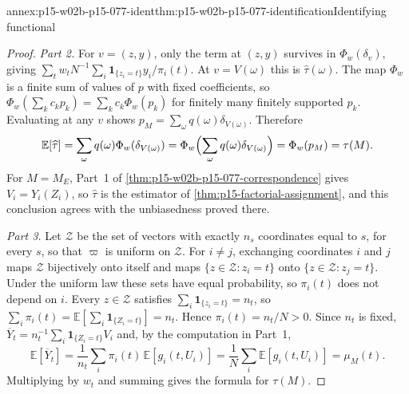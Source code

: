\begin{annexitem}{annex:p15-w02b-p15-077-ident}{thm:p15-w02b-p15-077-identification}{Identifying functional}
\begin{proof}
\emph{Part 2.} For \(v=(z,y)\), only the term at \((z,y)\) survives in
\(\Phi_w(\delta_v)\), giving
\(\sum_tw_tN^{-1}\sum_i\mathbf 1_{\{z_i=t\}}y_i/\pi_i(t)\). At
\(v=V(\omega)\) this is \(\widehat\tau(\omega)\). The map \(\Phi_w\) is a
finite sum of values of \(p\) with fixed coefficients, so
\(\Phi_w(\sum_kc_kp_k)=\sum_kc_k\Phi_w(p_k)\) for finitely many finitely
supported \(p_k\). Evaluating at any \(v\) shows
\(p_M=\sum_\omega q(\omega)\delta_{V(\omega)}\). Therefore
\[
 \mathbb E[\widehat\tau]=\sum_\omega q(\omega)\Phi_w(\delta_{V(\omega)})
 =\Phi_w\Bigl(\sum_\omega q(\omega)\delta_{V(\omega)}\Bigr)
 =\Phi_w(p_M)=\tau(M).
\]
For \(M=M_E\), Part~1 of \cref{thm:p15-w02b-p15-077-correspondence} gives
\(V_i=Y_i(Z_i)\), so \(\widehat\tau\) is the estimator of
\cref{thm:p15-factorial-assignment}, and this conclusion agrees with the
unbiasedness proved there.

\emph{Part 3.} Let \(\mathcal Z\) be the set of vectors with exactly
\(n_s\) coordinates equal to \(s\), for every \(s\), so that \(\varpi\)
is uniform on \(\mathcal Z\). For \(i\ne j\), exchanging coordinates
\(i\) and \(j\) maps \(\mathcal Z\) bijectively onto itself and maps
\(\{z\in\mathcal Z:z_i=t\}\) onto \(\{z\in\mathcal Z:z_j=t\}\). Under the
uniform law these sets have equal probability, so \(\pi_i(t)\) does not
depend on \(i\). Every \(z\in\mathcal Z\) satisfies
\(\sum_i\mathbf 1_{\{z_i=t\}}=n_t\), so
\(\sum_i\pi_i(t)=\mathbb E[\sum_i\mathbf 1_{\{Z_i=t\}}]=n_t\).
Hence \(\pi_i(t)=n_t/N>0\). Since \(n_t\) is fixed,
\(\overline Y_t=n_t^{-1}\sum_i\mathbf 1_{\{Z_i=t\}}V_i\) and, by the
computation in Part~1,
\[
 \mathbb E[\overline Y_t]=\frac1{n_t}\sum_i\pi_i(t)\,
   \mathbb E[g_i(t,U_i)]
 =\frac1N\sum_i\mathbb E[g_i(t,U_i)]=\mu_M(t).
\]
Multiplying by \(w_t\) and summing gives the formula for \(\tau(M)\).
\end{proof}
\end{annexitem}

